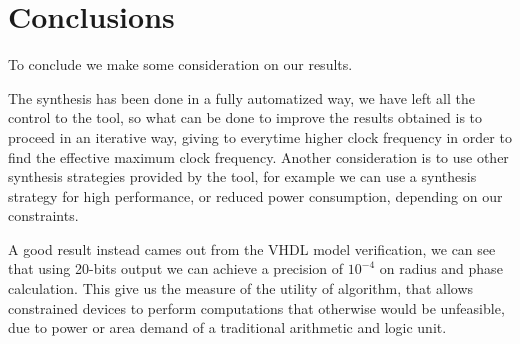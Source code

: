 \chapter{Conclusions}\label{ch:conclusions}

To conclude we make some consideration on our results.

The synthesis has been done in a fully automatized way, we have left all the
control to the tool, so what can be done to improve the results obtained is to
proceed in an iterative way, giving to \vivado{} everytime higher clock
frequency in order to find the effective maximum clock frequency. Another
consideration is to use other synthesis strategies provided by the tool, for
example we can use a synthesis strategy for high performance, or reduced power
consumption, depending on our constraints.

A good result instead cames out from the VHDL model verification, we can see
that using 20-bits output we can achieve a precision of \(10^{-4}\) on radius
and phase calculation. This give us the measure of the utility of \cordic{}
algorithm, that allows constrained devices to perform computations that
otherwise would be unfeasible, due to power or area demand of a traditional
arithmetic and logic unit.
